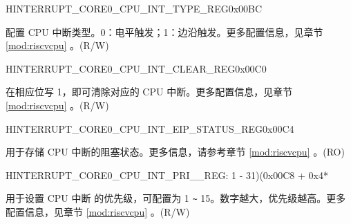\begin{register}{H}{INTERRUPT\_CORE0\_CPU\_INT\_TYPE\_REG}{0x00BC}\label{regdesc:INTERRUPTCORE0CPUINTTYPEREG}
%
\regnewline%
\begin{regdesc}\begin{reglist}
\label{fielddesc:INTERRUPTCORE0CPUINTTYPE}\item [INTERRUPT\_CORE0\_CPU\_INT\_TYPE] 配置 CPU 中断类型。0：电平触发；1：边沿触发。更多配置信息，见章节 \ref{mod:riscvcpu} \textit{}。(R/W)
\end{reglist}\end{regdesc}
\end{register}


\begin{register}{H}{INTERRUPT\_CORE0\_CPU\_INT\_CLEAR\_REG}{0x00C0}\label{regdesc:INTERRUPTCORE0CPUINTCLEARREG}
%
\regnewline%
\begin{regdesc}\begin{reglist}
\label{fielddesc:INTERRUPTCORE0CPUINTCLEAR}\item [INTERRUPT\_CORE0\_CPU\_INT\_CLEAR] 在相应位写 1，即可清除对应的 CPU 中断。更多配置信息，见章节 \ref{mod:riscvcpu} \textit{}。(R/W)
\end{reglist}\end{regdesc}
\end{register}


\begin{register}{H}{INTERRUPT\_CORE0\_CPU\_INT\_EIP\_STATUS\_REG}{0x00C4}\label{regdesc:INTERRUPTCORE0CPUINTEIPSTATUSREG}
%
\regnewline%
\begin{regdesc}\begin{reglist}
\label{fielddesc:INTERRUPTCORE0CPUINTEIPSTATUS}\item [INTERRUPT\_CORE0\_CPU\_INT\_EIP\_STATUS] 用于存储 CPU 中断的阻塞状态。更多信息，请参考章节 \ref{mod:riscvcpu} \textit{}。(RO)
\end{reglist}\end{regdesc}
\end{register}


\begin{register}{H}{INTERRUPT\_CORE0\_CPU\_INT\_PRI\_\_REG}{: 1 - 31)(0x00C8 + 0x4*}\label{regdesc:INTERRUPTCORE0CPUINTPRI0REG}
%
%
\regnewline%
\begin{regdesc}\begin{reglist}
\label{fielddesc:INTERRUPTCORE0CPUPRI0MAP}\item [INTERRUPT\_CORE0\_CPU\_PRI\_\regindex{n}\_MAP] 用于设置 CPU 中断  的优先级，可配置为 1 \verb+~+ 15。数字越大，优先级越高。更多配置信息，见章节 \ref{mod:riscvcpu} \textit{}。(R/W)
\end{reglist}\end{regdesc}
\end{register}

